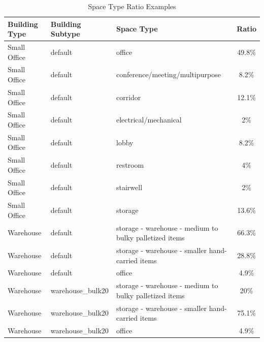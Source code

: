 \begin{table}
\small
\caption[Space Type Ratio Example]{Space Type Ratio Examples}
\label{tab:space_type_ratios}
\centering
\begin{tabular}{|l|l|l|c|}
\hline
\textbf{Building Type} & \textbf{Building Subtype} & \textbf{Space Type} & \textbf{Ratio} \\ \hline
Small Office & default & office & 49.8\% \\ \hline
Small Office & default & conference/meeting/multipurpose & 8.2\% \\ \hline
Small Office & default & corridor & 12.1\% \\ \hline
Small Office & default & electrical/mechanical & 2\% \\ \hline
Small Office & default & lobby & 8.2\% \\ \hline
Small Office & default & restroom & 4\% \\ \hline
Small Office & default & stairwell & 2\% \\ \hline
Small Office & default & storage & 13.6\% \\ \hline
Warehouse & default & storage - warehouse - medium to bulky palletized items & 66.3\% \\ \hline
Warehouse & default & storage - warehouse - smaller hand-carried items & 28.8\% \\ \hline
Warehouse & default & office & 4.9\% \\ \hline
Warehouse & warehouse\_bulk20 & storage - warehouse - medium to bulky palletized items & 20\% \\ \hline
Warehouse & warehouse\_bulk20 & storage - warehouse - smaller hand-carried items & 75.1\% \\ \hline
Warehouse & warehouse\_bulk20 & office & 4.9\% \\ \hline
\end{tabular}
\end{table}
